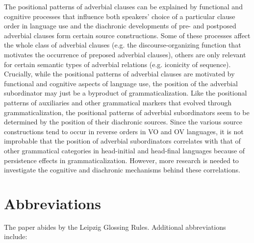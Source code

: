 \documentclass[output=paper]{langsci/langscibook}
\begin{document}
The positional patterns of adverbial clauses can be explained by functional and cognitive processes that influence both speakers’ choice of a particular clause order in language use and the diachronic developments of pre- and postposed adverbial clauses form certain source constructions. Some of these processes affect the whole class of adverbial clauses (e.g. the discourse-organizing function that motivates the occurrence of preposed adverbial clauses), others are only relevant for certain semantic types of adverbial relations (e.g. iconicity of sequence). Crucially, while the positional patterns of adverbial clauses are motivated by functional and cognitive aspects of language use, the position of the adverbial subordinator may just be a byproduct of grammaticalization. Like the positional patterns of auxiliaries and other grammatical markers that evolved through grammaticalization, the positional patterns of adverbial subordinators seem to be determined by the position of their diachronic sources. Since the various source constructions tend to occur in reverse orders in VO and OV languages, it is not improbable that the position of adverbial subordinators correlates with that of other grammatical categories in head-initial and head-final languages because of persistence effects in grammaticalization. However, more research is needed to investigate the cognitive and diachronic mechanisms behind these correlations.

\section*{Abbreviations}

The paper abides by the Leipzig Glossing Rules. Additional abbreviations include:
\end{document}
